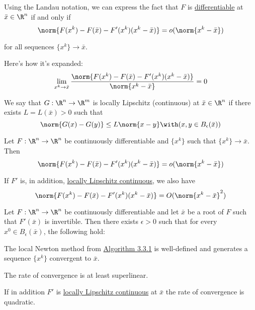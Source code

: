 
\label{b4ee31d}

Using the Landau notation, we can express the fact that $F$ is
\href{c62315d}{differentiable} at $\bar x\in\R^n$ if and only if
$$
  \norm{F(x^k)-F(\bar x)-F'(x^k)(x^k-\bar x)}=o(\norm{x^{k}-\bar x})
$$

for all sequences $\{x^k\}\to\bar x$.

Here's how it's expanded:
$$
  \lim_{x^k\to\bar x}\frac{\norm{F(x^k)-F(\bar x)-F'(x^k)(x^k-\bar x)}}{\norm{x^k-\bar x}}=0
$$

\label{ba65fa0}

We say that $G:\R^n\to\R^m$ is locally Lipschitz (continuous) at $\bar
x\in\R^n$ if there exists $L=L(\bar x)>0$ such that
$$
  \norm{G(x)-G(y)}\leq L\norm{x-y}\with(x,y\in B_\epsilon(\bar x))
$$

\label{a71a60e}

Let $F:\R^n\to\R^n$ be continuously differentiable and $\{x^k\}$ such that
$\{x^k\}\to\bar x$. Then
\begin{equation*}
  \norm{F(x^k)-F(\bar x)-F'(x^k)(x^k-\bar x)}=o(\norm{x^{k}-\bar x})
\end{equation*}

If $F'$ is, in addition, \href{ba65fa0}{locally Lipschitz continuous}, we also
have
\begin{equation*}
  \norm{F(x^k)-F(\bar x)-F'(x^k)(x^k-\bar x)}=O(\norm{x^{k}-\bar x}^2)
\end{equation*}

\label{fc03f3f}

Let $F:\R^n\to\R^n$ be continuously differentiable and let $\bar x$ be a root
of $F$ such that $F'(\bar x)$ is invertible. Then there exists $\epsilon>0$
such that for every $x^0\in B_\epsilon(\bar x)$, the following hold:
\begin{enumerata}
  \item The local Newton method from \href{abbc9be}{Algorithm 3.3.1} is well-defined
  and generates a sequence $\{x^k\}$ convergent to $\bar x$.
  \item The rate of convergence is at least superlinear.
  \item If in addition $F'$ is \href{ba65fa0}{locally Lipschitz continuous} at $\bar x$
  the rate of convergence is quadratic.
\end{enumerata}

